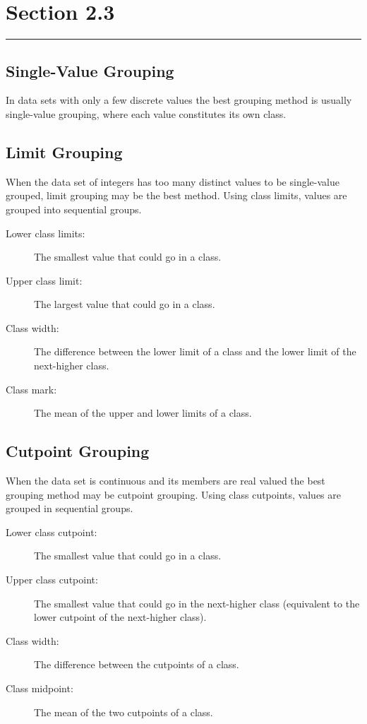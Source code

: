 \documentclass[12pt]{article}
\begin{document}
    \section*{Section 2.3}
    \noindent\rule{\textwidth}{0.4pt}
        \subsection*{Single-Value Grouping}
            In data sets with only a few discrete values the best grouping method is usually
            single-value grouping, where each value constitutes its own class.
        \subsection*{Limit Grouping}
            When the data set of integers has too many distinct values to be single-value 
            grouped, limit grouping may be the best method. Using class limits, values are
            grouped into sequential groups.
            \begin{description}
                \item[Lower class limits:] The smallest value that could go in a class.
                \item[Upper class limit:] The largest value that could go in a class. 
                \item[Class width:] The difference between the lower limit of a class and
                the lower limit of the next-higher class.
                \item[Class mark:] The mean of the upper and lower limits of a class.
            \end{description}
        \subsection*{Cutpoint Grouping}
            When the data set is continuous and its members are real valued the best
            grouping method may be cutpoint grouping. Using class cutpoints, values are
            grouped in sequential  groups.
            \begin{description}
                \item[Lower class cutpoint:] The smallest value that could go in a class.
                \item[Upper class cutpoint:] The smallest value that could go in the
                next-higher class (equivalent to the lower cutpoint of the next-higher
                class).
                \item[Class width:] The difference between the cutpoints of a class.
                \item[Class midpoint:] The mean of the two cutpoints of a class.
            \end{description}
\end{document}
